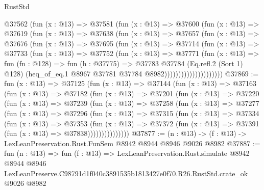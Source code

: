 \begin{lexlean}{RustStd}
\begin{coremodule}
                  @37562
                    (fun (x : @13) =>
                    @37581
                      (fun (x : @13) =>
                      @37600
                        (fun (x : @13) =>
                        @37619
                          (fun (x : @13) =>
                          @37638
                            (fun (x : @13) =>
                            @37657
                              (fun (x : @13) =>
                              @37676
                                (fun (x : @13) =>
                                @37695
                                  (fun (x : @13) =>
                                  @37714
                                    (fun (x : @13) =>
                                    @37733
                                      (fun (x : @13) =>
                                      @37752
                                        (fun (x : @13) =>
                                        @37771
                                          (fun (x : @13) =>
                                          fun (fn : @128) =>
                                          fun (h : @37775) =>
                                          @37783
                                            @37784
                                            (Eq.refl.{2} (Sort 1) @128)
                                            (heq_of_eq.{1}
                                              @8967
                                              @37781
                                              @37784
                                              @8982)))))))))))))))))))))
@37869 := fun (x : @13) =>
  @37125
    (fun (x : @13) =>
    @37144
      (fun (x : @13) =>
      @37163
        (fun (x : @13) =>
        @37182
          (fun (x : @13) =>
          @37201
            (fun (x : @13) =>
            @37220
              (fun (x : @13) =>
              @37239
                (fun (x : @13) =>
                @37258
                  (fun (x : @13) =>
                  @37277
                    (fun (x : @13) =>
                    @37296
                      (fun (x : @13) =>
                      @37315
                        (fun (x : @13) =>
                        @37334
                          (fun (x : @13) =>
                          @37353
                            (fun (x : @13) =>
                            @37372 (fun (x : @13) => @37391 (fun (x : @13) => @37838)))))))))))))))
@37877 := (n : @13) -> (f : @13) -> LexLeanPreservation.Rust.FunSem @8942 @8944 @8946 @9026 @8982
@37887 := fun (n : @13) =>
  fun (f : @13) =>
  LexLeanPreservation.Rust.simulate
    @8942
    @8944
    @8946
    LexLeanPreserve.C98791d1f040c3891535b1813427e0f70.R26.RustStd.crate_ok
    @9026
    @8982
\end{coremodule}
\end{lexlean}
